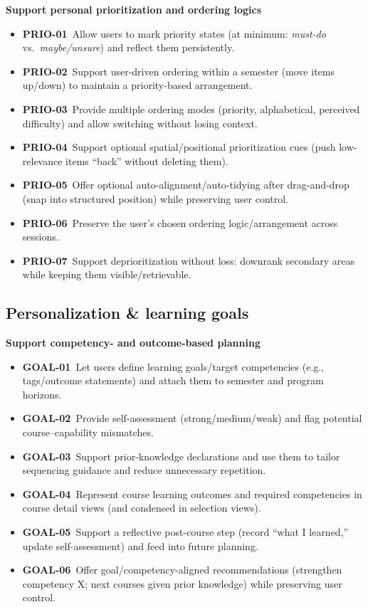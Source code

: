 \textbf{Support personal prioritization and ordering logics}
\begin{itemize}
  \item \textbf{PRIO-01}~Allow users to mark priority states (at minimum: \emph{must-do} vs.\ \emph{maybe/unsure}) and reflect them persistently.
  \item \textbf{PRIO-02}~Support user-driven ordering within a semester (move items up/down) to maintain a priority-based arrangement.
  \item \textbf{PRIO-03}~Provide multiple ordering modes (priority, alphabetical, perceived difficulty) and allow switching without losing context.
  \item \textbf{PRIO-04}~Support optional spatial/positional prioritization cues (push low-relevance items “back” without deleting them).
  \item \textbf{PRIO-05}~Offer optional auto-alignment/auto-tidying after drag-and-drop (snap into structured position) while preserving user control.
  \item \textbf{PRIO-06}~Preserve the user’s chosen ordering logic/arrangement across sessions.
  \item \textbf{PRIO-07}~Support deprioritization without loss: downrank secondary areas while keeping them visible/retrievable.
\end{itemize}


\subsection*{Personalization \& learning goals}

\textbf{Support competency- and outcome-based planning}
\begin{itemize}
  \item \textbf{GOAL-01}~Let users define learning goals/target competencies (e.g., tags/outcome statements) and attach them to semester and program horizons.
  \item \textbf{GOAL-02}~Provide self-assessment (strong/medium/weak) and flag potential course--capability mismatches.
  \item \textbf{GOAL-03}~Support prior-knowledge declarations and use them to tailor sequencing guidance and reduce unnecessary repetition.
  \item \textbf{GOAL-04}~Represent course learning outcomes and required competencies in course detail views (and condensed in selection views).
  \item \textbf{GOAL-05}~Support a reflective post-course step (record “what I learned,” update self-assessment) and feed into future planning.
  \item \textbf{GOAL-06}~Offer goal/competency-aligned recommendations (strengthen competency X; next courses given prior knowledge) while preserving user control.
\end{itemize}


